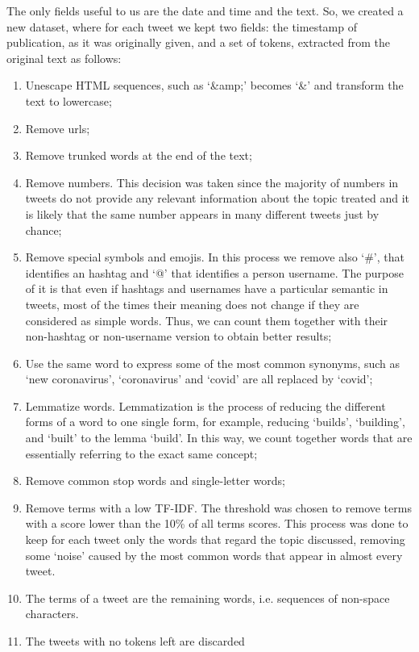 The only fields useful to us are the date and time and the text. 
So, we created a new dataset, where for each tweet we kept two fields: 
the timestamp of publication, as it was originally given, and a set of tokens, 
extracted from the original text as follows:
\begin{enumerate}
    \item Unescape HTML sequences, such as `\&amp;' becomes `\&' and transform the text to lowercase;
    \item Remove  urls;
    \item Remove trunked words at the end of the text;
    \item Remove numbers. This decision was taken since the majority of numbers in tweets
        do not provide any relevant information about the topic treated and it is likely 
        that the same number appears in many different tweets just by chance;
    \item Remove special symbols and emojis. In this process we remove also `\#', that 
        identifies an hashtag and `@' that identifies a person username. The purpose of it 
        is that even if hashtags and usernames have a particular semantic in tweets, most 
        of the times their meaning does not change if they are considered as simple words.
        Thus, we can count them together with their non-hashtag or non-username version to 
        obtain better results;
    \item Use the same word to express some of the most common synonyms, 
        such as `new coronavirus', `coronavirus' and `covid' are all replaced by `covid';
    \item Lemmatize words. Lemmatization is the process of reducing the different 
        forms of a word to one single form, for example, reducing `builds', 
        `building', and `built' to the lemma `build'. In this way, we count together 
        words that are essentially referring to the exact same concept;
    \item Remove common stop words and single-letter words;
    \item Remove terms with a low TF-IDF. The threshold was chosen to remove terms with 
        a score lower than the 10\% of all terms scores. This process was done to 
        keep for each tweet only the words that regard the topic discussed, removing
        some `noise' caused by the most common words that appear in almost every tweet.
    \item The terms of a tweet are the remaining words, i.e. sequences of non-space
        characters.
    \item The tweets with no tokens left are discarded
\end{enumerate}

